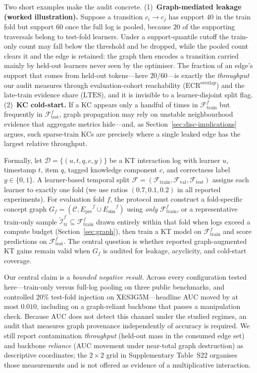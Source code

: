 \documentclass[preprint,10pt,doubleblind]{elsarticle}
\newcommand{\Epre}{\ensuremath{E_{\text{pre}}}}
\newcommand{\Esim}{\ensuremath{E_{\text{sim}}}}
\newcommand{\KC}{knowledge component}
\begin{document}
Two short examples make the audit concrete. (1)~\textbf{Graph-mediated
leakage (worked illustration).} Suppose a transition $c_i\!\to\!c_j$ has
support $40$ in the train fold but support $60$ once the full log is pooled,
because $20$ of the supporting traversals belong to test-fold learners. Under
a support-quantile cutoff the train-only count may fall below the threshold and be
dropped, while the pooled count clears it and the edge is retained: the graph
then encodes a transition carried mainly by held-out learners never seen by the
optimiser. The fraction of an edge's support that comes from held-out
tokens---here $20/60$---is exactly the \emph{throughput} our audit measures
through evaluation-cohort reachability
($\mathrm{ECR}^{\mathrm{overlap}}$) and the late-train evidence share
($\mathrm{LTES}$), and it is invisible to a
learner-disjoint split flag. (2)~\textbf{KC cold-start.} If a KC appears only a
handful of times in $\mathcal{F}_{\text{train}}^f$ but frequently in
$\mathcal{F}_{\text{test}}^f$, graph propagation may rely on unstable
neighbourhood evidence that aggregate metrics hide---and, as
Section~\ref{sec:disc-implications} argues, such sparse-train KCs are precisely
where a single leaked edge has the largest relative throughput.

Formally, let $\mathcal{D}=\{(u,t,q,c,y)\}$ be a KT interaction log
with learner $u$, timestamp $t$, item $q$, tagged \KC{} $c$, and
correctness label $y\in\{0,1\}$. A learner-based temporal split
$\mathcal{F}=(\mathcal{F}_{\text{train}},\mathcal{F}_{\text{val}},
\mathcal{F}_{\text{test}})$ assigns each learner to exactly one fold
(we use ratios $(0.7,0.1,0.2)$ in all reported experiments). For
evaluation fold $f$, the protocol must construct a fold-specific concept
graph $G_f=(\mathcal{C},\Epre^f\cup\Esim^f)$ using \emph{only}
$\mathcal{F}_{\text{train}}^f$, or a representative train-only sample
$\tilde{\mathcal{I}}^f_{\text{tr}}\subseteq\mathcal{F}^f_{\text{train}}$
drawn entirely within that fold when logs exceed a compute budget
(Section~\ref{sec:graph}), then train a KT model on
$\mathcal{F}_{\text{train}}^f$ and score predictions on
$\mathcal{F}_{\text{test}}^f$. The central question is whether reported
graph-augmented KT gains remain valid when $G_f$ is audited for leakage,
acyclicity, and cold-start coverage.

Our central claim is a \emph{bounded negative result}. Across every
configuration tested here---train-only versus full-log pooling on three
public benchmarks, and controlled 20\% test-fold injection on
XES3G5M---headline AUC moved by at most $0.010$, including on a
graph-reliant backbone that passes a manipulation check. Because AUC
does not detect this channel under the studied regimes, an audit that
measures graph provenance independently of accuracy is required. We
still report contamination \emph{throughput} (held-out mass in the
consumed edge set) and backbone \emph{reliance} (AUC movement under
near-total graph destruction) as descriptive coordinates; the $2{\times}2$
grid in Supplementary Table~S22 organises those measurements and is
not offered as evidence of a multiplicative interaction.
\end{document}
